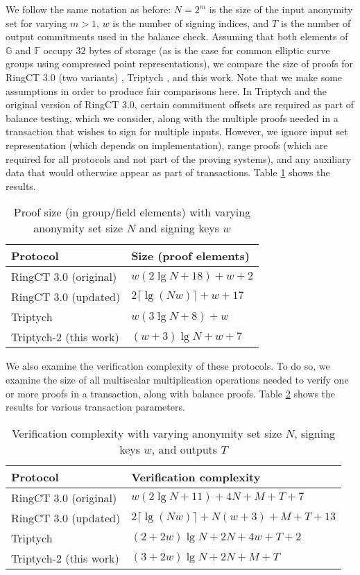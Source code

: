 \documentclass{article}
\newcommand{\G}{\mathbb{G}}
\newcommand{\F}{\mathbb{F}}
\theoremstyle{definition}
\begin{document}
We follow the same notation as before: $N = 2^m$ is the size of the input anonymity set for varying $m > 1$, $w$ is the number of signing indices, and $T$ is the number of output commitments used in the balance check.
Assuming that both elements of $\G$ and $\F$ occupy $32$ bytes of storage (as is the case for common elliptic curve groups using compressed point representations), we compare the size of proofs for RingCT 3.0 (two variants) \cite{rct3}, Triptych \cite{triptych}, and this work.
Note that we make some assumptions in order to produce fair comparisons here.
In Triptych and the original version of RingCT 3.0, certain commitment offsets are required as part of balance testing, which we consider, along with the multiple proofs needed in a transaction that wishes to sign for multiple inputs.
However, we ignore input set representation (which depends on implementation), range proofs (which are required for all protocols and not part of the proving systems), and any auxiliary data that would otherwise appear as part of transactions.
Table \ref{table:size} shows the results.

\begin{table}
\centering
\begin{tabular}{|ll|}
\hline
Protocol & Size (proof elements) \\
\hline
RingCT 3.0 (original) \cite{rct3} & $w(2 \lg N + 18) + w + 2$ \\
RingCT 3.0 (updated) \cite{rct3} & $2\lceil \lg(Nw) \rceil + w + 17$ \\
Triptych \cite{triptych} & $w(3 \lg N + 8) + w$ \\
Triptych-2 (this work) & $(w + 3)\lg N + w + 7$ \\
\hline
\end{tabular}
\caption{Proof size (in group/field elements) with varying anonymity set size $N$ and signing keys $w$}
\label{table:size}
\end{table}

We also examine the verification complexity of these protocols.
To do so, we examine the size of all multiscalar multiplication operations needed to verify one or more proofs in a transaction, along with balance proofs.
Table \ref{table:time} shows the results for various transaction parameters.

\begin{table}
\centering
\begin{tabular}{|ll|}
\hline
Protocol & Verification complexity \\
\hline
RingCT 3.0 (original) \cite{rct3} & $w(2\lg N + 11) + 4N + M + T + 7$ \\
RingCT 3.0 (updated) \cite{rct3} & $2\lceil \lg(Nw) \rceil + N(w + 3) + M + T + 13$ \\
Triptych \cite{triptych} & $(2 + 2w)\lg N + 2N + 4w + T + 2$ \\
Triptych-2 (this work) & $(3 + 2w)\lg N + 2N + M + T$ \\
\hline
\end{tabular}
\caption{Verification complexity with varying anonymity set size $N$, signing keys $w$, and outputs $T$}
\label{table:time}
\end{table}
\end{document}

